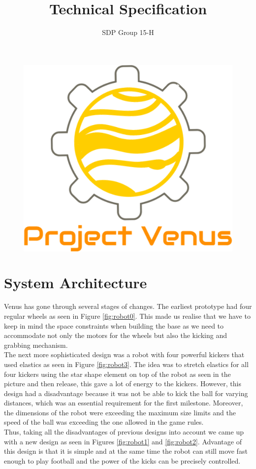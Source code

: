 \documentclass[12pt]{article}
\title{Technical Specification}
\author{SDP Group 15-H}
\begin{document}
\begin{figure}
    \vspace*{-3em}
    \centering
    \includegraphics[scale=.18]{logo.png}
\end{figure}

\setlength{\droptitle}{-4em}
\maketitle

\section{System Architecture}

Venus has gone through several stages of changes. The earliest prototype had four regular wheels as seen in Figure \ref{fig:robot0}. This made us realise that we have to keep in mind the space
constraints when building the base as we need to accommodate not only the motors
for the wheels but also the kicking and grabbing mechanism. 
\\The next more sophisticated design was a robot with four powerful kickers that used elastics as seen in Figure \ref{fig:robot3}. The idea was to stretch elastics for all four kickers using the star shape element on top of the robot as seen in the picture and then release, this gave a lot of energy to the kickers. However, this design had a disadvantage because it was not be able to kick the ball for varying distances, which was an essential requirement for the first milestone. Moreover, the dimensions of the robot were exceeding the maximum size limits and the speed of the ball was exceeding the one allowed in the game rules. 
\\Thus, taking all the disadvantages of previous designs into account we came up with a new design as seen in Figures \ref{fig:robot1} and \ref{fig:robot2}. Advantage of this design is that it is simple and at the same time the robot can still move fast enough to play football and the power of the kicks can be precisely controlled. 
\end{document}
